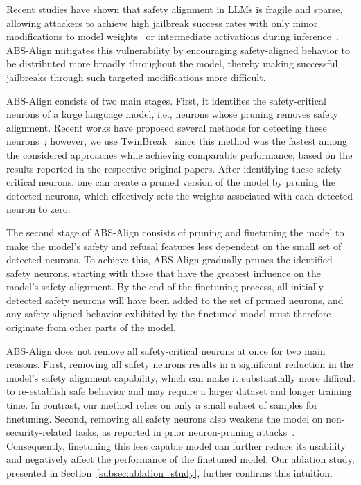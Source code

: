 Recent studies have shown that safety alignment in LLMs is fragile and sparse, allowing attackers to achieve high jailbreak success rates with only minor modifications to model weights~\cite{wei2024brittleness, twinbreak, wu2026neurostrike} or intermediate activations during inference~\cite{arditi2024refusal}. ABS-Align mitigates this vulnerability by encouraging safety-aligned behavior to be distributed more broadly throughout the model, thereby making successful jailbreaks through such targeted modifications more difficult.

ABS-Align consists of two main stages. First, it identifies the safety-critical neurons of a large language model, i.e., neurons whose pruning removes safety alignment. Recent works have proposed several methods for detecting these neurons~\cite{twinbreak, wu2026neurostrike, wei2024brittleness}; however, we use TwinBreak~\cite{twinbreak} since this method was the fastest among the considered approaches while achieving comparable performance, based on the results reported in the respective original papers. After identifying these safety-critical neurons, one can create a pruned version of the model by pruning the detected neurons, which effectively sets the weights associated with each detected neuron to zero. 

The second stage of ABS-Align consists of pruning and finetuning the model to make the model's safety and refusal features less dependent on the small set of detected neurons. To achieve this, ABS-Align gradually prunes the identified safety neurons, starting with those that have the greatest influence on the model's safety alignment. By the end of the finetuning process, all initially detected safety neurons will have been added to the set of pruned neurons, and any safety-aligned behavior exhibited by the finetuned model must therefore originate from other parts of the model.

ABS-Align does not remove all safety-critical neurons at once for two main reasons. First, removing all safety neurons results in a significant reduction in the model's safety alignment capability, which can make it substantially more difficult to re-establish safe behavior and may require a larger dataset and longer training time. In contrast, our method relies on only a small subset of samples for finetuning. Second, removing all safety neurons also weakens the model on non-security-related tasks, as reported in prior neuron-pruning attacks~\cite{twinbreak, wu2026neurostrike}. Consequently, finetuning this less capable model can further reduce its usability and negatively affect the performance of the finetuned model. Our ablation study, presented in Section~\ref{subsec:ablation_study}, further confirms this intuition.


